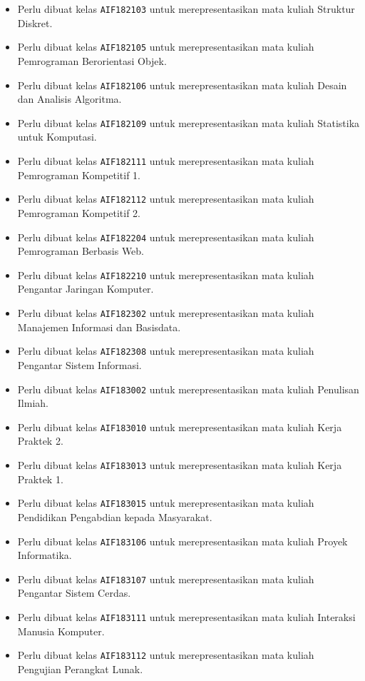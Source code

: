 \begin{enumerate}
\begin{itemize}
		\item Perlu dibuat kelas \texttt{AIF182103} untuk merepresentasikan mata kuliah Struktur Diskret.
		\item Perlu dibuat kelas \texttt{AIF182105} untuk merepresentasikan mata kuliah Pemrograman Berorientasi Objek.
		\item Perlu dibuat kelas \texttt{AIF182106} untuk merepresentasikan mata kuliah Desain dan Analisis Algoritma.
		\item Perlu dibuat kelas \texttt{AIF182109} untuk merepresentasikan mata kuliah Statistika untuk Komputasi.
		\item Perlu dibuat kelas \texttt{AIF182111} untuk merepresentasikan mata kuliah Pemrograman Kompetitif 1.
		\item Perlu dibuat kelas \texttt{AIF182112} untuk merepresentasikan mata kuliah Pemrograman Kompetitif 2.
		\item Perlu dibuat kelas \texttt{AIF182204} untuk merepresentasikan mata kuliah Pemrograman Berbasis Web.
		\item Perlu dibuat kelas \texttt{AIF182210} untuk merepresentasikan mata kuliah Pengantar Jaringan Komputer.
		\item Perlu dibuat kelas \texttt{AIF182302} untuk merepresentasikan mata kuliah Manajemen Informasi dan Basisdata.
		\item Perlu dibuat kelas \texttt{AIF182308} untuk merepresentasikan mata kuliah Pengantar Sistem Informasi.
		\item Perlu dibuat kelas \texttt{AIF183002} untuk merepresentasikan mata kuliah Penulisan Ilmiah.
		\item Perlu dibuat kelas \texttt{AIF183010} untuk merepresentasikan mata kuliah Kerja Praktek 2.
		\item Perlu dibuat kelas \texttt{AIF183013} untuk merepresentasikan mata kuliah Kerja Praktek 1.
		\item Perlu dibuat kelas \texttt{AIF183015} untuk merepresentasikan mata kuliah Pendidikan Pengabdian kepada Masyarakat.
		\item Perlu dibuat kelas \texttt{AIF183106} untuk merepresentasikan mata kuliah Proyek Informatika.
		\item Perlu dibuat kelas \texttt{AIF183107} untuk merepresentasikan mata kuliah Pengantar Sistem Cerdas.
		\item Perlu dibuat kelas \texttt{AIF183111} untuk merepresentasikan mata kuliah Interaksi Manusia Komputer.
		\item Perlu dibuat kelas \texttt{AIF183112} untuk merepresentasikan mata kuliah Pengujian Perangkat Lunak.

\end{itemize}
\end{enumerate}
